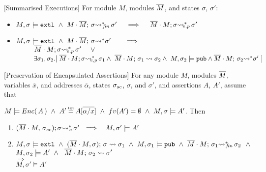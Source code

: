 { \begin{auxLemma}
\label{lemma:external_breakdown:term}[Summarised Executions]
For   module $M$, modules $\overline{M}$, and states $\sigma$, $\sigma'$:
\\
\begin{itemize}
\item
$M,\sigma \models \extThis\ \wedge \ \leadstoBoundedStarFin {M\cdot \Mtwo}  {\sigma}  {\sigma'}  \ \ \  \ 
\Longrightarrow \ \ \  \ \leadstoBoundedExtPub {\Mtwo\cdot M}    {\sigma}  {\sigma'}$
\item
$M,\sigma \models \extThis\ \wedge \ \leadstoBoundedStar  {M\cdot \Mtwo}  {\sigma}  {\sigma'}  \ \ \  \ \ \  
\Longrightarrow$\\
$\strut \ \ \ \ \ \ \ \    \leadstoBoundedExtPub {\Mtwo\cdot M}    {\sigma}  {\sigma'}\ \ \ \  \vee$\\
$\strut \ \ \ \ \ \ \ \    \exists \sigma_1,\sigma_2.[\ 
\leadstoBoundedExtPub {\Mtwo\cdot M}    {\sigma}  {\sigma_1} 
\wedge\ \leadstoBounded  {\Mtwo\cdot M}    {\sigma_1}  {\sigma_2} 
\wedge \ M, \sigma_2 \models \pubMeth \wedge \leadstoBoundedStar  {\Mtwo\cdot M}    {\sigma_2}  {\sigma'} \ ]
$
\end{itemize}
\end{auxLemma}
 





\begin{auxLemma}
\label{lemma:external_exec_preserves_more}[Preservation of Encapsulated Assertions]
For any module $M$, modules $\overline{M}$, variables $\overline x$, and addresses $\overline \alpha$,
 states $\sigma_{sc}$, $\sigma$, and $\sigma'$, and assertions $A$, $A'$, 
assume that

\noindent
 $M \models \encaps A \   \wedge  \ A'\txteq A[\overline{\alpha/x}]\  \wedge \ fv(A')=\emptyset \  \wedge \ 
M, \sigma \models  A' $. Then

\begin{enumerate}

\item
$   (\overline{M}\cdot M,\, {\sigma_{sc}}); \sigma{\rightsquigarrow^*}\!\!_{e}\, \sigma' 
\ \ \Longrightarrow \ \ \ M, \sigma' \models A'$

\item
$M, \sigma  \models \mbox{\normalfont{\texttt{extl}}} \ \wedge \  (\overline{M}\cdot M, \sigma);\, {\sigma} \rightsquigarrow \sigma_{1} \ \wedge
 \ M, \sigma_1 \models \mbox{\normalfont{\texttt{pub}}} \ \wedge\  \overline{M}\cdot M;\, {\sigma_1} {\rightsquigarrow^*}\!\!_{\mathit{fin}}\, \sigma_2    \ \ \wedge$\\
$ M, \sigma_2 \models A' \ \wedge \ 
  \   \leadstoBounded  {\Mtwo\cdot M} {\sigma_2}      {\sigma'}$\\
 $\Longrightarrow $
\\
$M, \sigma' \models A' $


\end{enumerate}
\end{auxLemma}}
